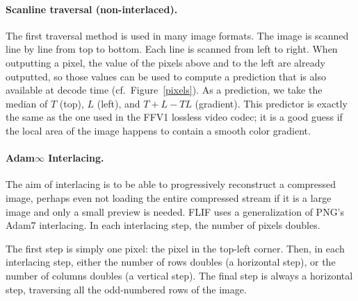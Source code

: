 \documentclass{article}
\begin{document}
\paragraph{Scanline traversal (non-interlaced).}
\label{sec:simple_traversal}
The first traversal method is used in many image formats.
The image is scanned line by line from top to bottom. Each line is scanned from left to right.
When outputting a pixel, the value of the pixels above and to the left are already outputted,
so those values can be used to compute a prediction that is also available at decode time (cf.\ Figure~\ref{pixels}).
%
As a prediction, we take the median of %
$T$ (top), $L$ (left), and $T+L-TL$ (gradient).
This predictor is exactly the same as the one used in the FFV1 lossless video codec; it is a good guess if
the local area of the image happens to contain a smooth color gradient.




\paragraph{Adam$\infty$ Interlacing.}
\label{sec:interlacing}
The aim of interlacing is to be able to progressively reconstruct a compressed image, perhaps even
not loading the entire compressed stream if it is a large image and only a small preview is needed.
FLIF uses a generalization of PNG's Adam7 interlacing. In each interlacing step, the number of pixels
doubles.

The first step is simply one pixel: the pixel in the top-left corner.
Then, in each interlacing step, either the number of rows doubles (a horizontal step),
or the number of columns doubles (a vertical step). The final step is always a horizontal step, traversing all the
odd-numbered rows of the image.
\end{document}
